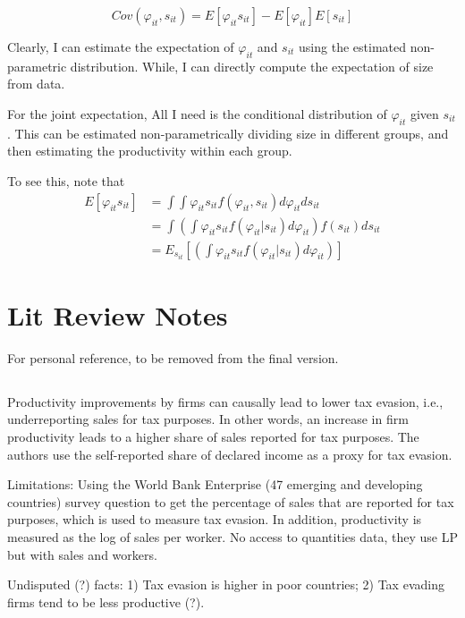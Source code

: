 \documentclass[
  12pt]{article}
\theoremstyle{definition}
\theoremstyle{remark}
\begin{document}
\[
Cov(\varphi_{it}, s_{it}) = E[\varphi_{it} s_{it}] - E[\varphi_{it}]E[s_{it}]
\]

Clearly, I can estimate the expectation of \(\varphi_{it}\) and
\(s_{it}\) using the estimated non-parametric distribution. While, I can
directly compute the expectation of size from data.

For the joint expectation, All I need is the conditional distribution of
\(\varphi_{it}\) given \(s_{it}\). This can be estimated
non-parametrically dividing size in different groups, and then
estimating the productivity within each group.

To see this, note that \[
\begin{aligned}
    E[\varphi_{it} s_{it}] &= \int \int \varphi_{it} s_{it} f(\varphi_{it}, s_{it}) d\varphi_{it} ds_{it} \\
    &= \int \left(\int \varphi_{it} s_{it}  f(\varphi_{it}|s_{it}) d\varphi_{it}\right) f(s_{it}) ds_{it}\\
    &= E_{s_{it}}\left[ \left(\int \varphi_{it} s_{it}  f(\varphi_{it}|s_{it}) d\varphi_{it}\right) \right]
\end{aligned}
\]

\section{Lit Review Notes}\label{lit-review-notes}

For personal reference, to be removed from the final version.

\subsection{\texorpdfstring{\citet{Dabla2019}}{@Dabla2019}}\label{dabla2019}

Productivity improvements by firms can causally lead to lower tax
evasion, i.e., underreporting sales for tax purposes. In other words, an
increase in firm productivity leads to a higher share of sales reported
for tax purposes. The authors use the self-reported share of declared
income as a proxy for tax evasion.

Limitations: Using the World Bank Enterprise (47 emerging and developing
countries) survey question to get the percentage of sales that are
reported for tax purposes, which is used to measure tax evasion. In
addition, productivity is measured as the log of sales per worker. No
access to quantities data, they use LP but with sales and workers.

Undisputed (?) facts: 1) Tax evasion is higher in poor countries; 2) Tax
evading firms tend to be less productive (?).
\end{document}
